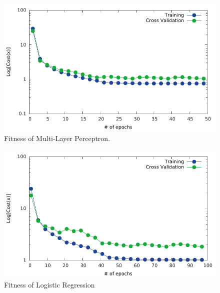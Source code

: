\documentclass[11pt]{article}
\begin{document}
\begin{minipage}{0.47\linewidth}
  \begin{figure}[H]
    \centering
    \includegraphics[width=\linewidth]{epoch_mlp}
    \caption{Fitness of Multi-Layer Perceptron.}
    \label{fig:epoch_mlp}
  \end{figure}
\end{minipage}\hfill
\begin{minipage}{0.47\linewidth}
  \begin{figure}[H]
    \centering
    \includegraphics[width=\linewidth]{epoch_logit}
    \caption{Fitness of Logistic Regression}
    \label{fig:epoch_logit}
  \end{figure}
\end{minipage}
\end{document}
